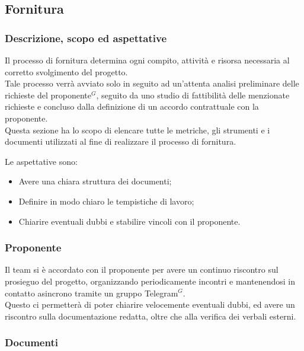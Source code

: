 \subsection{Fornitura}

\subsubsection{Descrizione, scopo ed aspettative}

Il processo di fornitura determina ogni compito, attività e risorsa necessaria al corretto svolgimento del progetto. \\
Tale processo verrà avviato solo in seguito ad un’attenta analisi preliminare delle richieste del proponente$^{G}$, seguito da uno studio di fattibilità delle menzionate
richieste e concluso dalla definizione di un accordo contrattuale con la proponente. \\

Questa sezione ha lo scopo di elencare tutte le metriche, gli strumenti e i documenti utilizzati al fine di realizzare il processo di fornitura.

Le aspettative sono:
\begin{itemize}
    \item Avere una chiara struttura dei documenti;
    \item Definire in modo chiaro le tempistiche di lavoro;
    \item Chiarire eventuali dubbi e stabilire vincoli con il proponente.
\end{itemize}
\subsubsection{Proponente}

Il team si è accordato con il proponente per avere un continuo riscontro sul prosieguo del progetto,  organizzando periodicamente incontri e mantenendosi in contatto asincrono tramite un gruppo Telegram$^{G}$. \\
Questo ci permetterà di poter chiarire velocemente eventuali dubbi, ed avere un riscontro sulla documentazione redatta, oltre che alla verifica dei verbali esterni.

\subsubsection{Documenti}



